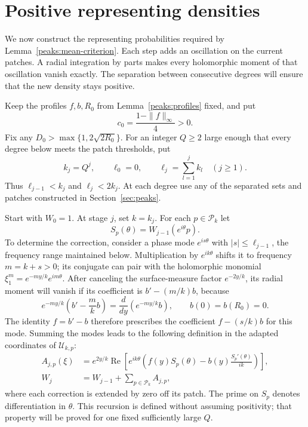\section{Positive representing densities}\label{sec:densities}

We now construct the representing probabilities required by
Lemma~\ref{peaks:mean-criterion}.  Each step adds an oscillation on
the current patches.  A radial integration by parts makes every
holomorphic moment of that oscillation vanish exactly.  The
separation between consecutive degrees will ensure that the new
density stays positive.

Keep the profiles $f,b,R_0$ from Lemma~\ref{peaks:profiles} fixed,
and put
\[
 c_0=\frac{1-\|f\|_\infty}{4}>0.
\]
Fix any $D_0>\max\{1,2\sqrt{2R_0}\}$.  For an integer $Q\ge2$
large enough that every degree below meets the patch thresholds,
put
\begin{equation}\label{density:degrees}
 k_j=Q^j,\qquad \ell_0=0,\qquad
 \ell_j=\sum_{l=1}^j k_l\quad(j\ge1).
\end{equation}
Thus $\ell_{j-1}<k_j$ and $\ell_j<2k_j$.  At each degree use any
of the separated sets and patches constructed in Section~\ref{sec:peaks}.

Start with $W_0=1$.  At stage $j$, set $k=k_j$.  For each
$p\in\mathcal P_k$ let
\[
 S_p(\theta)=W_{j-1}(e^{i\theta}p).
\]
To determine the correction, consider a phase mode $e^{is\theta}$
with $|s|\le\ell_{j-1}$, the frequency range maintained below.
Multiplication by $e^{ik\theta}$ shifts it to frequency
$m=k+s>0$; its conjugate can pair with the holomorphic monomial
$\xi_1^m=e^{-my/k}e^{im\theta}$.  After canceling the surface-measure factor
$e^{-2y/k}$, its radial moment will vanish if its coefficient is
$b'-(m/k)b$, because
\[
 e^{-my/k}\left(b'-\frac{m}{k}b\right)
 =\frac{d}{dy}\left(e^{-my/k}b\right),
 \qquad b(0)=b(R_0)=0.
\]
The identity $f=b'-b$ therefore prescribes the coefficient
$f-(s/k)b$ for this mode.  Summing the modes leads to the following
definition in the adapted coordinates of $\mathcal U_{k,p}$:
\begin{equation}\label{density:recursion}
 \begin{split}
 A_{j,p}(\xi)
 &=e^{2y/k}\operatorname{Re}\left[
     e^{ik\theta}\left(f(y)S_p(\theta)
               -b(y)\frac{S_p'(\theta)}{ik}\right)\right],\\
 W_j&=W_{j-1}+\sum_{p\in\mathcal P_k}A_{j,p},
 \end{split}
\end{equation}
where each correction is extended by zero off its patch.  The
prime on $S_p$ denotes differentiation in $\theta$.  This recursion
is defined without assuming positivity; that property will be
proved for one fixed sufficiently large $Q$.

